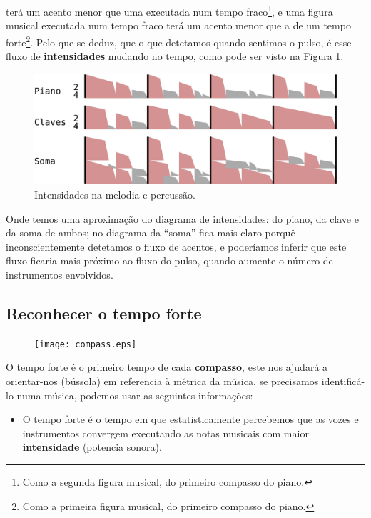 terá um acento menor que uma executada num tempo fraco\footnote{Como
a segunda figura musical, do primeiro compasso do piano.}, 
e uma figura musical executada num tempo fraco terá um acento menor que a de um tempo forte\footnote{Como
a primeira figura musical, do primeiro compasso do piano.}.
Pelo que se deduz, que o que detetamos quando sentimos o pulso, 
é esse fluxo de \hyperref[sec:pos:Intensidade]{\textbf{intensidades}} mudando no tempo, 
como pode ser visto na Figura \ref{ritmo:procurando-pulso2}.
\begin{figure}[!h]
\centering
    \includegraphics[width=\textwidth]{chapters/cap-musicalidade-percepcion/procurando-pulso2.eps}
\caption{Intensidades na melodia e percussão.}
\label{ritmo:procurando-pulso2}
\end{figure}
Onde temos uma aproximação do diagrama de intensidades: do piano, da clave e da soma de ambos;
no diagrama da ``soma'' fica mais claro porquê inconscientemente detetamos o fluxo de acentos,
e poderíamos inferir que este fluxo ficaria mais próximo ao fluxo do pulso, 
quando aumente o número de instrumentos envolvidos.


\subsection{Reconhecer o tempo forte}
\label{subsec:perceberTF1}

\begin{figure}
  \vspace{-10pt}
  \centering
    \texttt{[image: compass.eps]}
  \vspace{-10pt}
\end{figure}
O tempo forte é o primeiro tempo de cada \hyperref[def:Compasso]{\textbf{compasso}},
este nos ajudará a orientar-nos (bússola) em referencia à métrica da música, 
se precisamos identificá-lo numa música, podemos usar as seguintes informações:
\begin{itemize}
\item O tempo forte é o tempo em que estatisticamente percebemos que as vozes e 
instrumentos convergem executando as notas musicais com maior  \hyperref[sec:pos:Intensidade]{\textbf{intensidade}}  (potencia sonora). 
\end{itemize}

